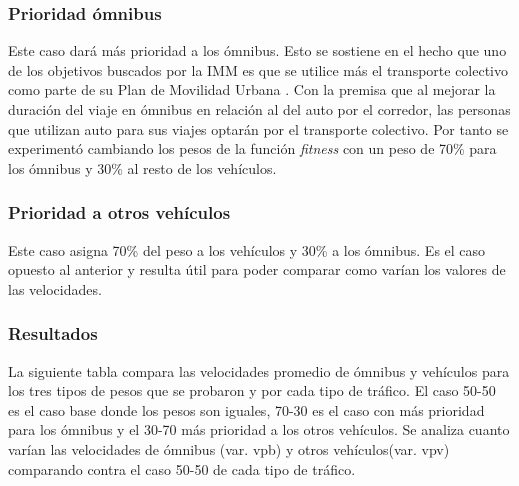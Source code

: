 



\subsubsection{Prioridad ómnibus}
Este caso dará más prioridad a los ómnibus. Esto se sostiene en el hecho que uno de los objetivos buscados por la IMM  es que se utilice más el transporte colectivo como parte de su Plan de Movilidad Urbana \citep{PlanMovilidad}. Con la premisa que al mejorar la duración del viaje en ómnibus en relación al del auto por el corredor, las personas que utilizan auto para sus viajes optarán por el transporte colectivo. Por tanto se experimentó cambiando los pesos de la función \emph{fitness} con un peso de 70\% para los ómnibus y 30\% al resto de los vehículos.


\subsubsection{Prioridad a otros vehículos}

Este caso asigna 70\% del peso a los vehículos y 30\% a los ómnibus. Es el caso opuesto al anterior y resulta útil para poder comparar como varían los valores de las velocidades.

\subsubsection{Resultados}

La siguiente tabla compara las velocidades promedio de ómnibus y vehículos para los tres tipos de pesos que se probaron y por cada tipo de tráfico.  El caso 50-50 es el caso base donde los pesos son iguales, 70-30 es el caso con más prioridad para los ómnibus y el 30-70 más prioridad a los otros vehículos. Se analiza cuanto varían las velocidades de ómnibus (var. vpb) y otros vehículos(var. vpv) comparando contra el caso 50-50 de cada tipo de tráfico.


